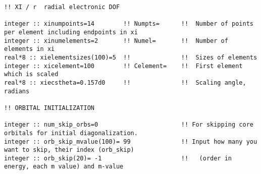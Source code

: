 \begin{verbatim}
!! XI / r  radial electronic DOF

integer :: xinumpoints=14        !! Numpts=      !!  Number of points per element including endpoints in xi
integer :: xinumelements=2       !! Numel=       !!  Number of elements in xi
real*8 :: xielementsizes(100)=5  !!              !!  Sizes of elements
integer :: xicelement=100        !! Celement=    !!  First element which is scaled
real*8 :: xiecstheta=0.157d0     !!              !!  Scaling angle, radians

!! ORBITAL INITIALIZATION

integer :: num_skip_orbs=0                       !! For skipping core orbitals for initial diagonalization.
integer :: orb_skip_mvalue(100)= 99              !! Input how many you want to skip, their index (orb_skip)
integer :: orb_skip(20)= -1                      !!   (order in energy, each m value) and m-value
\end{verbatim}
